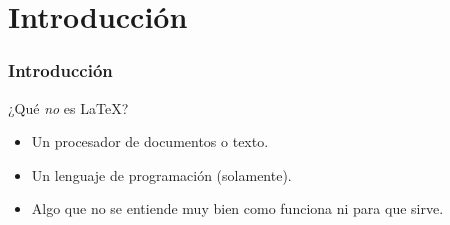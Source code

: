 \section{Introducción}\label{sec:Introducción}

\begin{frame}
    \frametitle{Introducción}
        \begin{tcolorbox}[colframe=color1]
            \begin{center}
                ¿Qué \textit{no} es \LaTeX ?
            \end{center}
        \end{tcolorbox}
        \begin{itemize}
            \item Un procesador de documentos o texto.
            \item Un lenguaje de programación (solamente).
            \item Algo que no se entiende muy bien como funciona ni para que sirve. 
        \end{itemize}
        
    \end{frame}

